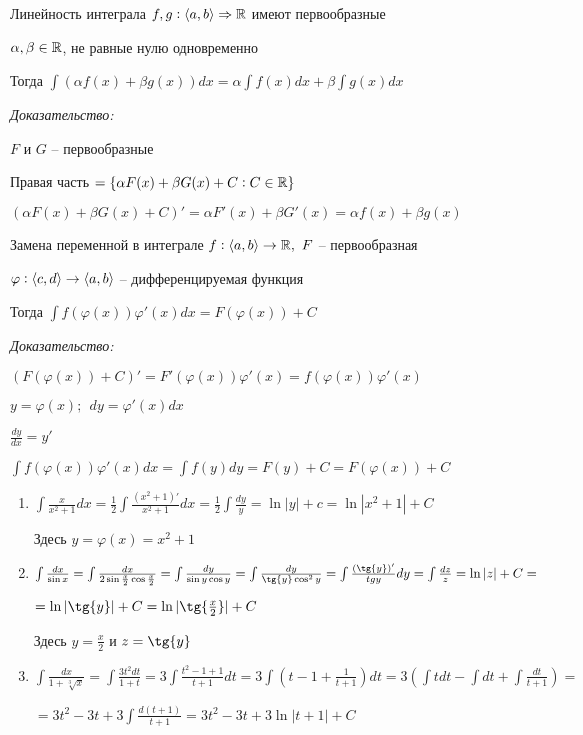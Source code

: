 \documentclass[12pt]{article}
\begin{document}
\begin{theo}{Линейность интеграла}
    $f, g : \langle a, b \rangle \Rightarrow \mathbb R$ имеют первообразные

    $\alpha, \beta \in \mathbb R$, не равные нулю одновременно

    Тогда $\int (\alpha f(x) + \beta g(x))dx = \alpha \int f(x)dx + \beta \int g(x)dx$
\end{theo}

\textit{Доказательство:}

$F$ и $G$ -- первообразные

Правая часть $= \{ \alpha F(x) + \beta G(x) + C : C \in \mathbb R \}$

$(\alpha F(x) + \beta G(x) + C)' = \alpha F'(x) + \beta G'(x) = \alpha f(x) + \beta g(x)$

\begin{theo}{Замена переменной в интеграле}
    $f : \langle a, b \rangle \rightarrow \mathbb R,\ F$ -- первообразная
    
    $\varphi : \langle c, d \rangle \rightarrow \langle a, b \rangle$ -- дифференцируемая функция

    Тогда $\int f(\varphi(x))\varphi'(x)dx = F(\varphi(x)) + C$
\end{theo}

\textit{Доказательство:}

$(F(\varphi(x)) + C)' = F'(\varphi(x))\varphi'(x) = f(\varphi(x))\varphi'(x)$

\begin{Remark}{}
    $y = \varphi(x);\ \ dy = \varphi'(x)dx$

    $\frac{dy}{dx} = y'$

    $\int f(\varphi(x)) \varphi'(x)dx = \int f(y)dy = F(y) + C = F(\varphi(x)) + C$
\end{Remark}

\begin{Example}{}
    \begin{enumerate}
        \item $\int \frac{x}{x^2 + 1}dx = \frac{1}{2} \int \frac{(x^2 + 1)'}{x^2 + 1}dx = \frac{1}{2} \int \frac{dy}{y} = \ln{|y|} + c = \ln{|x^2 + 1|} + C$
        
        Здесь $y = \varphi(x) = x^2 + 1$

        \item $\int \frac{dx}{\sin{x}} = \int \frac{dx}{2\sin{\frac{x}{2}}\cos{\frac{x}{2}}} = \int \frac{dy}{\sin{y}\cos{y}} = \int \frac{dy}{\tg{y}\cos^2{y}} = \int \frac{(\tg{y})'}{tg{y}}dy = \int \frac{dz}{z} = \ln{|z|} + C =$
        
        $= \ln{|\tg{y}|} + C = \ln{|\tg{\frac{x}{2}}|} + C$

        Здесь $y = \frac{x}{2}$ и $z = \tg{y}$

        \item $\int \frac{dx}{1 + \sqrt[3]{x}} = \int \frac{3t^2dt}{1 + t} = 3\int \frac{t^2 - 1 + 1}{t + 1}dt = 3\int (t - 1 + \frac{1}{t + 1})dt = 3(\int tdt - \int dt + \int \frac{dt}{t + 1}) =$
        
        $= 3t^2 - 3t + 3\int \frac{d(t + 1)}{t + 1} = 3t^2 - 3t + 3\ln{|t + 1|} + C$
    \end{enumerate}
\end{Example}
\end{document}
